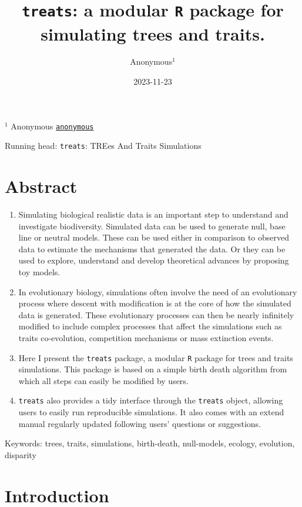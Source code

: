 \documentclass[
]{article}
\title{\texttt{treats}: a modular \texttt{R} package for simulating
trees and traits.}
\author{Anonymous\(^1\)}%
\date{2023-11-23}
\begin{document}
\maketitle

\(^1\) Anonymous %
\href{mailto:anonymous}{\nolinkurl{anonymous}}%

Running head: \texttt{treats}: TREes And Traits Simulations

\hypertarget{abstract}{%
\section{Abstract}\label{abstract}}

\begin{enumerate}
\def\labelenumi{\arabic{enumi}.}
\item
  Simulating biological realistic data is an important step to
  understand and investigate biodiversity. Simulated data can be used to
  generate null, base line or neutral models. These can be used either
  in comparison to observed data to estimate the mechanisms that
  generated the data. Or they can be used to explore, understand and
  develop theoretical advances by proposing toy models.
\item
  In evolutionary biology, simulations often involve the need of an
  evolutionary process where descent with modification is at the core of
  how the simulated data is generated. These evolutionary processes can
  then be nearly infinitely modified to include complex processes that
  affect the simulations such as traits co-evolution, competition
  mechanisms or mass extinction events.
\item
  Here I present the \texttt{treats} package, a modular \texttt{R}
  package for trees and traits simulations. This package is based on a
  simple birth death algorithm from which all steps can easily be
  modified by users.
\item
  \texttt{treats} also provides a tidy interface through the
  \texttt{treats} object, allowing users to easily run reproducible
  simulations. It also comes with an extend manual regularly updated
  following users' questions or suggestions.
\end{enumerate}

Keywords: trees, traits, simulations, birth-death, null-models, ecology,
evolution, disparity

\hypertarget{introduction}{%
\section{Introduction}\label{introduction}}
\end{document}
